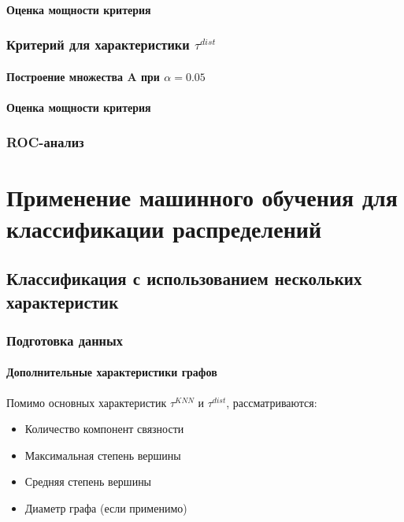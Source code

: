 \documentclass[a4paper,12pt]{report}
\begin{document}
\subsection{Оценка мощности критерия}

\section{Критерий для характеристики $\tau^{dist}$}

\subsection{Построение множества A при $\alpha = 0.05$}

\subsection{Оценка мощности критерия}

\section{ROC-анализ}

\part{Применение машинного обучения для классификации распределений}

\chapter{Классификация с использованием нескольких характеристик}

\section{Подготовка данных}

\subsection{Дополнительные характеристики графов}
Помимо основных характеристик $\tau^{KNN}$ и $\tau^{dist}$, рассматриваются:
\begin{itemize}
    \item Количество компонент связности
    \item Максимальная степень вершины
    \item Средняя степень вершины
    \item Диаметр графа (если применимо)
\end{itemize}
\end{document}
